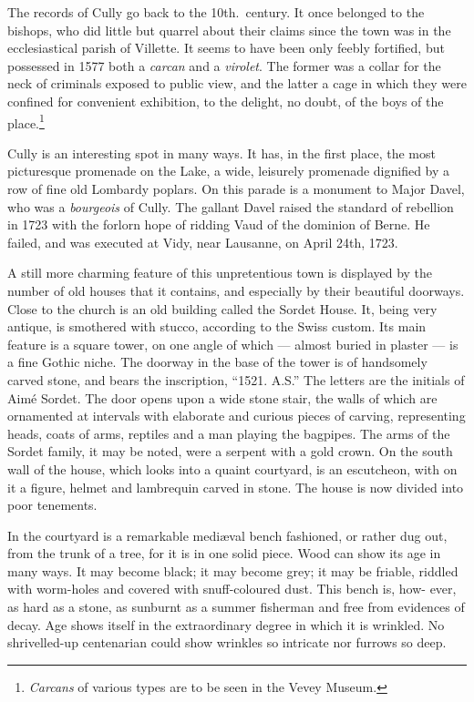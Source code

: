 \documentclass[11pt,a4paper,twocolumn]{article}
\begin{document}
The records of Cully go back to the 10th.\ century. It once belonged to
the bishops, who did little but quarrel about their claims since the
town was in the ecclesiastical parish of Villette. It seems to have
been only feebly fortified, but possessed in 1577 both a \emph{carcan}
and a \emph{virolet}\@. The former was a collar for the neck of
criminals exposed to public view, and the latter a cage in which they
were confined for convenient exhibition, to the delight, no doubt, of
the boys of the place.\footnote{\emph{Carcans} of various types are to
be seen in the Vevey Museum.}


Cully is an interesting spot in many ways. It has, in the first place,
the most picturesque promenade on the Lake, a wide, leisurely promenade
dignified by a row of fine old Lombardy poplars. On this parade is a
monument to \mbox{Major} Davel, who was a \emph{bourgeois} of Cully. The
gallant Davel raised the standard of rebellion in 1723 with the forlorn
hope of ridding Vaud of the dominion of Berne. He failed, and was
executed at Vidy, near Lausanne, on April 24th, 1723.

A still more charming feature of this unpretentious town is displayed
by the number of old houses that it contains, and especially by their
beautiful doorways. Close to the church is an old building called the
Sordet House. It, being very antique, is smothered with stucco,
according to the Swiss custom. Its main feature is a square tower, on
one angle of which --- almost buried in plaster --- is a fine Gothic
niche. The doorway in the base of the tower is of handsomely carved
stone, and bears the inscription, ``1521. A.S.'' The letters are the
initials of Aim\'{e} Sordet. The door opens upon a wide stone stair, the
walls of which are ornamented at intervals with elaborate and curious
pieces of carving, representing heads, coats of arms, reptiles and a
man playing the bagpipes. The arms of the Sordet family, it may be
noted, were a serpent with a gold crown. On the south wall of the
house, which looks into a quaint courtyard, is an escutcheon, with on
it a figure, helmet and lambrequin carved in stone. The house is now
divided into poor tenements.

In the courtyard is a remarkable medi\ae val bench fashioned, or rather
dug out, from the trunk of a tree, for it is in one solid piece. Wood
can show its age in many ways. It may become black; it may become grey;
it may be friable, riddled with worm-holes and covered with
snuff-coloured dust. This bench is, how- ever, as hard as a stone, as
sunburnt as a summer fisherman and free from evidences of decay. Age
shows itself in the extraordinary degree in which it is wrinkled. No
shrivelled-up centenarian could show wrinkles so intricate nor furrows
so deep.
\end{document}
